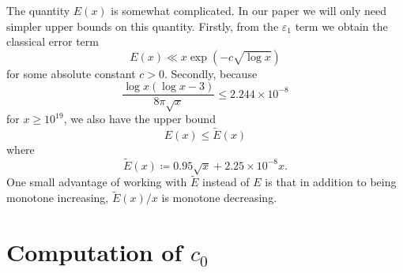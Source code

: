 \documentclass[12pt,a4paper,reqno]{amsart}
\numberwithin{equation}{section}
\theoremstyle{plain}
\theoremstyle{definition}
\newcommand\eps{\varepsilon}
\begin{document}
The quantity $E(x)$ is somewhat complicated.  In our paper we will only need simpler upper bounds on this quantity.  Firstly, from the $\eps_1$ term we obtain the classical error term
\begin{equation}\label{ecx}
E(x) \ll x \exp(-c \sqrt{\log x})
\end{equation}
for some absolute constant $c>0$.  Secondly, because
$$ \frac{\log x (\log x-3)}{8\pi\sqrt{x}}  \leq 2.244 \times 10^{-8}$$
for $x \geq 10^{19}$, we also have the upper bound
\begin{equation}\label{ecx-2}
E(x) \leq \tilde E(x)
\end{equation}
where
\begin{equation}\label{tilde-e}
  \tilde E(x) \coloneqq 0.95 \sqrt{x} + 2.25 \times 10^{-8} x.
\end{equation}
One small advantage of working with $\tilde E$ instead of $E$ is that in addition to being monotone increasing, $\tilde E(x)/x$ is monotone decreasing.



  


\section{Computation of \texorpdfstring{$c_0$}{c\_0}}\label{c0-app}
\end{document}
